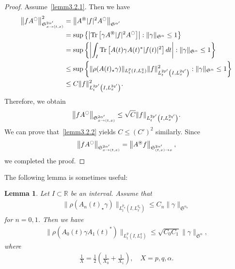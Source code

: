 \documentclass[10pt]{amsart}
\newtheorem{lemm}[theo]{Lemma}
\theoremstyle{definition}
\numberwithin{equation}{section}
\newcommand{\oast}{\circledast}
\newcommand{\FS}{\mathfrak{S}}
\newcommand{\al}{\alpha}
\newcommand{\ga}{\gamma}
\newcommand{\rh}{\rho}
\newcommand{\K}[1]{\left(#1\right)}
\newcommand{\abs}[1]{\left|#1\right|}
\DeclareMathOperator{\Tr}{Tr}
\newcommand{\Sxtx}{{\FS^{2\al'}_{x \to (t,x)}}}
\newcommand{\Stxx}{{\FS^{2\al'}_{(t,x) \to x}}}
\newcommand{\st}{\star}
\newcommand{\R}{\mathbb{R}}
\newcommand{\oc}{\ocircle}
\newcommand{\os}{\oast}
\begin{document}
\begin{proof}
Assume~\eqref{lemm3.2.1}. Then we have
\begin{equation}
\begin{split}
\left\|f A^\oc\right\|_\Sxtx^2 &= \left\|A^\os |f|^2 A^\oc\right\|_{\FS^{\al'}} \\
&= \sup \left\{ \left|\Tr\left[\ga A^\os |f|^2 A^\oc\right]\right | : \|\ga\|_{\FS^\al} \le 1\right\} \\
&= \sup \left \{ \abs{\int_I \Tr\left[A(t) \ga A(t)^* |f(t)|^2\right]dt } : \|\ga\|_{\FS^\al} \le 1 \right \} \\
&\le \sup \left \{ \|\rh(A(t)_\st \ga)\|_{L^p_t\left(I,L^q_x\right)} \|f\|_{L^{2p'}_t\left(I,L^{2q'}_x\right)}^2 : \|\ga\|_{\FS^\al} \le 1 \right \} \\
&\le C \|f\|_{L^{2p'}_t\left(I,L^{2q'}_x\right)}^2.
\end{split}
\end{equation}
Therefore, we obtain
\begin{align}
\left\|f A^\oc\right\|_\Sxtx \le \sqrt{C} \|f\|_{L^{2p'}_t\left(I,L^{2q'}_x\right)}.
\end{align}
We can prove that~\eqref{lemm3.2.2} yields $C \le (C')^2$ similarly. Since
\begin{align}
\left\|f A^\oc\right\|_{\Sxtx} = \left\|A^\os f\right\|_{\Stxx},
\end{align}
we completed the proof.
\end{proof}

The following lemma is sometimes useful:

\begin{lemm}\label{asym}
Let $I \subset \R$ be an interval. Assume that
\begin{align}
\|\rh(A_n(t)_\st \ga)\|_{L^{p_n}_t \left(I,L^{q_n}_x\right)} \le C_n \|\ga\|_{\FS^{\al_n}}
\end{align}
for $n=0,1$. Then we have
\begin{align}
\big\|\rh(A_0(t) \ga A_1(t)^*)\big\|_{L^p_t\left(I,L^q_x\right)} \le \sqrt{C_0 C_1} \|\ga\|_{\FS^\al},
\end{align}
where
\begin{align}
\frac{1}{X} = \frac{1}{2} \K{\frac{1}{X_0}+ \frac{1}{X_1}}, \quad X = p,q,\al.
\end{align}
\end{lemm}
\end{document}
